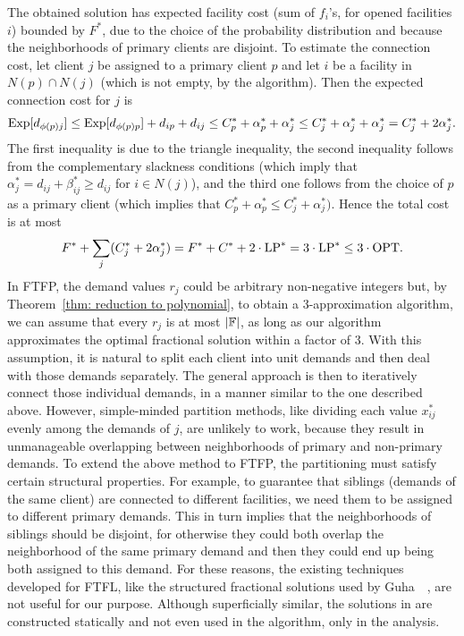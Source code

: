 \documentclass[11pt]{article}
\begin{document}
The obtained solution has expected facility cost (sum of
$f_i$'s, for opened facilities $i$) bounded by
$F^\ast$, due to the choice of the probability distribution
and because the neighborhoods of primary clients are
disjoint. To estimate the connection cost, let client $j$ be
assigned to a primary client $p$ and let $i$ be a facility
in $N(p)\cap N(j)$ (which is not empty, by the algorithm).
Then the expected connection cost for $j$ is
%
\begin{eqnarray*}
\mbox{\rm Exp}[d_{\phi(p)j}] \leq \mbox{\rm Exp}[d_{\phi(p)p}] + d_{ip} + d_{ij} 
					\leq C_p^\ast + \alpha_p^\ast + \alpha_j^\ast 
					\leq C_j^\ast + \alpha_j^\ast + \alpha_j^\ast 
					= C_j^\ast + 2\alpha_j^\ast. 
\end{eqnarray*}
%
The first inequality is due to the triangle
inequality, the second inequality follows from the complementary
slackness conditions (which imply that $\alpha_j^\ast = d_{ij} +
\beta_{ij}^\ast \geq d_{ij}$ for $i\in N(j)$), and the third one follows
from the choice of $p$ as a primary client (which implies that
$C_p^\ast + \alpha_p^\ast \le C_j^\ast + \alpha_j^\ast)$. 
Hence the total cost is at most 
%
\begin{eqnarray*}
	F^\ast + \sum_j (C^\ast_j + 2\alpha^\ast_j)
		= F^\ast + C^\ast+ 2\cdot\mbox{\rm LP}^\ast 
		= 3\cdot\mbox{\rm LP}^\ast 
		\leq 3\cdot\mbox{\rm OPT}.
\end{eqnarray*}
%
In FTFP, the demand values $r_j$ could be arbitrary
non-negative integers but, by Theorem~\ref{thm: reduction to
  polynomial}, to obtain a $3$-approximation algorithm, we
can assume that every $r_j$ is at most $|\mathbb{F}|$, as
long as our algorithm approximates the optimal fractional
solution within a factor of $3$.  With this assumption, it
is natural to split each client into unit demands and then
deal with those demands separately.  The general approach is
then to iteratively connect those individual demands, in a
manner similar to the one described above. However,
simple-minded partition methods, like dividing each value
$x^\ast_{ij}$ evenly among the demands of $j$, are unlikely
to work, because they result in unmanageable overlapping
between neighborhoods of primary and non-primary demands.
To extend the above method to FTFP, the partitioning must
satisfy certain structural properties. For example, to
guarantee that siblings (demands of the same client) are
connected to different facilities, we need them to be
assigned to different primary demands. This in turn implies
that the neighborhoods of siblings should be disjoint, for
otherwise they could both overlap the neighborhood of the
same primary demand and then they could end up being both
assigned to this demand. For these reasons, the existing
techniques developed for FTFL, like the structured fractional solutions
used by Guha~{\etal}~\cite{GuhaMM01}, are not useful for our
purpose. Although superficially similar, the solutions in
\cite{GuhaMM01} are constructed statically and not even used in the
algorithm, only in the analysis. 
\end{document}
